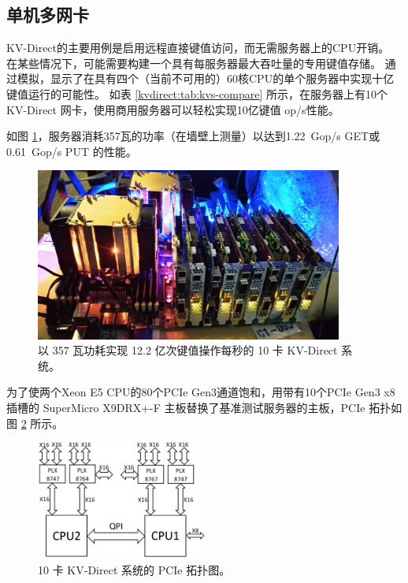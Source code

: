 \subsection{单机多网卡}
\label{kvdirect:sec:multi-nic}

KV-Direct的主要用例是启用远程直接键值访问，而无需服务器上的CPU开销。
在某些情况下，可能需要构建一个具有每服务器最大吞吐量的专用键值存储。
通过模拟，\cite {li2016full}显示了在具有四个（当前不可用的）60核CPU的单个服务器中实现十亿键值运行的可能性。
如表 \ref{kvdirect:tab:kvs-compare} 所示，在服务器上有10个KV-Direct 网卡，使用商用服务器可以轻松实现10亿键值 op/s性能。

如图 \ref{kvdirect:fig:photo}，服务器消耗357瓦的功率（在墙壁上测量）以达到1.22~Gop/s GET或0.61~Gop/s PUT 的性能。


\begin{figure}[htbp]
	\centering
	\includegraphics[width=0.9\textwidth]{figure/kvdirect_photo.jpg}
	\caption{以 357 瓦功耗实现 12.2 亿次键值操作每秒的 10 卡 KV-Direct 系统。}
	\label{kvdirect:fig:photo}
\end{figure}

为了使两个Xeon E5 CPU的80个PCIe Gen3通道饱和，用带有10个PCIe Gen3 x8插槽的 SuperMicro X9DRX+-F 主板替换了基准测试服务器的主板，PCIe 拓扑如图 \ref{kvdirect:fig:pcie_topology} 所示。


\begin{figure}[htbp]
	\centering
	\includegraphics[width=0.5\textwidth]{figure/pcie_topology.PNG}
	\caption{10 卡 KV-Direct 系统的 PCIe 拓扑图。}
	\label{kvdirect:fig:pcie_topology}
\end{figure}


